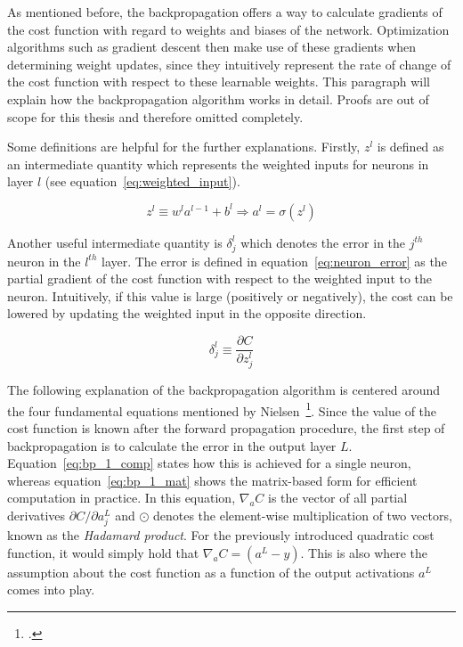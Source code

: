 As mentioned before, the backpropagation offers a way to calculate gradients
of the cost function with regard to weights and biases of the network.
Optimization algorithms such as gradient descent then make use of these 
gradients when determining weight updates, since they intuitively represent
the rate of change of the cost function with respect to these learnable weights.
This paragraph will explain how the backpropagation algorithm works in detail.
Proofs are out of scope for this thesis and therefore omitted completely.

Some definitions are helpful for the further explanations. Firstly,
$z^l$ is defined as an intermediate quantity which represents the weighted
inputs for neurons in layer $l$ (see equation~\ref{eq:weighted_input}).

\begin{equation}
  \label{eq:weighted_input}
  z^l \equiv w^l a^{l-1} + b^l \Rightarrow a^l = \sigma(z^l)
\end{equation}

Another useful intermediate quantity is $\delta_j^l$ which denotes the error
in the $j^{th}$ neuron in the $l^{th}$ layer. The error is defined in
equation~\ref{eq:neuron_error} as the partial gradient of the cost function
with respect to the weighted input to the neuron. Intuitively, if this value
is large (positively or negatively), the cost can be lowered by updating the 
weighted input in the opposite direction.

\begin{equation}
  \label{eq:neuron_error}
  \delta_j^l \equiv \frac{\partial C}{\partial z_j^l}
\end{equation}

The following explanation of the backpropagation algorithm is centered around
the four fundamental equations mentioned by Nielsen~\footcite{Nielsen2015}.
Since the value of the cost function is known after the forward propagation
procedure, the first step of backpropagation is to calculate the error in the
output layer $L$.
Equation~\ref{eq:bp_1_comp} states how this is achieved for a single neuron,
whereas equation~\ref{eq:bp_1_mat} shows the matrix-based form for efficient
computation in practice. In this equation, $\nabla_a C$ is the vector of all partial
derivatives $\partial C / \partial a_j^L$ and $\odot$ denotes the element-wise
multiplication of two vectors, known as the \textit{Hadamard product}.
For the previously introduced quadratic cost function, it would simply hold
that $\nabla_a C = (a^L -y)$.
This is also where the assumption about the cost function as a function of the
output activations $a^L$ comes into play.

